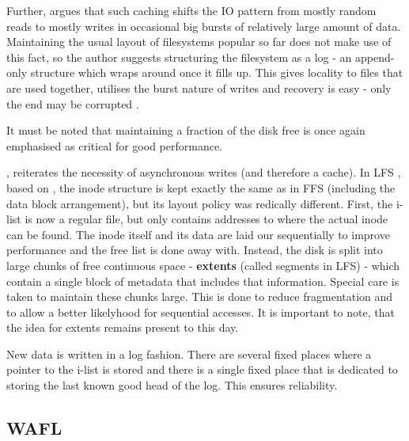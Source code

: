             Further, \citeauthor{IO_bottleneck} argues that such caching shifts
            the IO pattern from mostly random reads to mostly writes in
            occasional big bursts of relatively large amount of data.
            Maintaining the usual layout of filesystems popular so far does not
            make use of this fact, so the author suggests structuring the
            filesystem as a log - an append-only structure which wraps around
            once it fills up. This gives locality to files that are used
            together, utilises the burst nature of writes and recovery is easy
            - only the end may be corrupted \cite{IO_bottleneck}.

            It must be noted that maintaining a fraction of the disk free is
            once again emphasised as critical for good performance.

            \citeauthor{LFS}, reiterates the necessity of asynchronous writes
            (and therefore a cache). In LFS \cite{LFS}, based on
            \cite{IO_bottleneck}, the inode structure is kept exactly the same
            as in FFS (including the data block arrangement), but its layout
            policy was redically different. First, the i-list is now a regular
            file, but only contains addresses to where the actual inode can be
            found. The inode itself and its data are laid our sequentially to
            improve performance and the free list is done away with. Instead,
            the disk is split into large chunks of free continuous space -
            \textbf{extents} (called segments in LFS) - which contain a single
            block of metadata that includes that information.  Special care is
            taken to maintain these chunks large.  This is done to reduce
            fragmentation and to allow a better likelyhood for sequential
            accesses. It is important to note, that the idea for extents
            remains present to this day.

            New data is written in a log fashion. There are several fixed
            places where a pointer to the i-list is stored and there is a
            single fixed place that is dedicated to storing the last known good
            head of the log. This ensures reliability.

        \subsection{WAFL}
            \label{WAFL}

